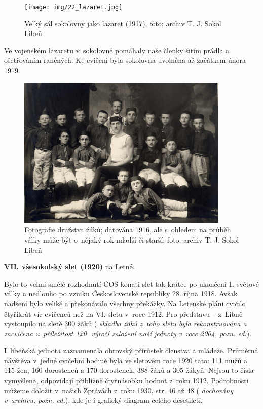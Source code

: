 \documentclass[a5paper, 11pt, twoside]{article}
\newcommand{\pozned}[1]{%
\textit{#1}}
\begin{document}
\begin{figure}[h!]
  \centering 
  \texttt{[image: img/22\_lazaret.jpg]}
  \caption*{Velký sál sokolovny jako lazaret (1917), foto: archiv T. J. Sokol
  Libeň}
\end{figure}

Ve vojenském lazaretu v~sokolovně pomáhaly naše členky šitím prádla a
ošetřováním raněných. Ke cvičení byla sokolovna uvolněna až začátkem
února 1919.

\begin{figure}[h!]
  \centering 
  \includegraphics[width=0.9\textwidth]{img/21_zaci_1916.jpg}
  \caption*{Fotografie družstva žáků; datována 1916, ale s~ohledem na průběh
  války může být o~nějaký rok mladší či starší; foto: archiv T. J.
  Sokol Libeň}
\end{figure}

\textbf{VII. všesokolský slet (1920)} na Letné.

Bylo to velmi smělé rozhodnutí ČOS konati slet tak krátce po ukončení 1.
světové války a nedlouho po vzniku Československé republiky 28. října
1918. Avšak nadšení bylo veliké a překonávalo všechny překážky. Na
Letenské pláni cvičilo čtyřikrát víc cvičenců než na VI. sletu v~roce
1912. Pro představu -- z~Libně vystoupilo na sletě 300 žáků
(\pozned{skladba žáků z~toho sletu byla rekonstruována a zacvičena
u~příležitost 120. výročí založení naší jednoty v~roce 2004, pozn. ed.}).

I~libeňská jednota zaznamenala obrovský přírůstek členstva a mládeže.
Průměrná návštěva v~jedné cvičební hodině byla ve sletovém roce 1920
tato: 111 mužů a 115 žen, 160 dorostenců a 170 dorostenek, 388 žáků a
305 žákyň. Nejsou to čísla vymyšlená, odpovídají přibližně čtyřnásobku
hodnot z~roku 1912. Podrobnosti můžeme doložit v~našich Zprávách z~roku
1930, str. 46 až 48 (\pozned{dochovány v~archivu, pozn. ed.}), kde je i
grafický diagram celého desetiletí.
\end{document}
